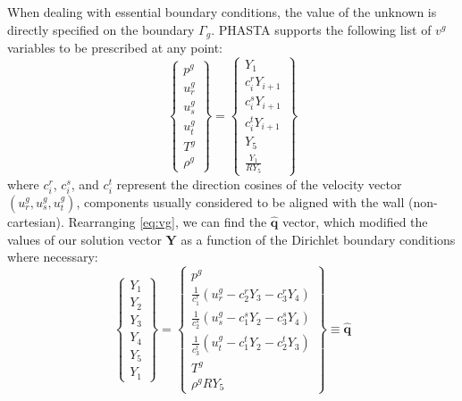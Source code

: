 \documentclass{ucb}
\begin{document}
When dealing with essential boundary conditions, the value of the unknown is directly specified on the boundary $\Gamma_g$. PHASTA supports the following list of $v^g$ variables to be prescribed at any point:
\begin{equation}
    \begin{Bmatrix}
        p^g \\ u_r^g \\ u_s^g \\ u_t^g \\ T^g \\ \rho^g
    \end{Bmatrix}
    =
    \begin{Bmatrix}
        Y_1 \\ c_i^r Y_{i+1} \\ c_i^s Y_{i+1} \\ c_i^t Y_{i+1} \\  Y_5 \\ \frac{Y_1}{RY_5}
    \end{Bmatrix}
    \label{eq:vg}
\end{equation}
where $c_i^r$, $c_i^s$, and $c_i^t$ represent the direction cosines of the velocity vector $\left(u_r^g, u_s^g, u_t^g\right)$, components usually considered to be aligned with the wall (non-cartesian). Rearranging \autoref{eq:vg}, we can find the $\bm{\hat{q}}$ vector, which modified the values of our solution vector $\bm{Y}$ as a function of the Dirichlet boundary conditions where necessary:
\begin{equation}
    \begin{Bmatrix}
        Y_1 \\ Y_2 \\ Y_3 \\ Y_4 \\ Y_5 \\ Y_1
    \end{Bmatrix}
    =
    \begin{Bmatrix}
        p^g \\
        \frac{1}{c_1^r}\left(u_r^g - c_2^r Y_3 - c_3^r Y_4\right) \\
        \frac{1}{c_2^s}\left(u_s^g - c_1^s Y_2 - c_3^s Y_4\right) \\
        \frac{1}{c_3^t}\left(u_t^g - c_1^t Y_2 - c_2^t Y_3\right) \\
        T^g \\
        \rho^g R Y_5
    \end{Bmatrix}
    \equiv
    \bm{\hat{q}}
    \label{eq:qv}
\end{equation}
\end{document}
